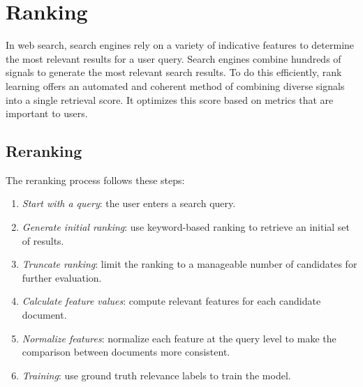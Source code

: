\section{Ranking}

In web search, search engines rely on a variety of indicative features to determine the most relevant results for a user query.
Search engines combine hundreds of signals to generate the most relevant search results. 
To do this efficiently, rank learning offers an automated and coherent method of combining diverse signals into a single retrieval score. 
It optimizes this score based on metrics that are important to users.

\subsection{Reranking}
The reranking process follows these steps: 
\begin{enumerate}
    \item \textit{Start with a query}: the user enters a search query.
    \item \textit{Generate initial ranking}: use keyword-based ranking to retrieve an initial set of results.
    \item \textit{Truncate ranking}: limit the ranking to a manageable number of candidates for further evaluation.
    \item \textit{Calculate feature values}: compute relevant features for each candidate document.
    \item \textit{Normalize features}: normalize each feature at the query level to make the comparison between documents more consistent.
    \item \textit{Training}: use ground truth relevance labels to train the model.
\end{enumerate}

